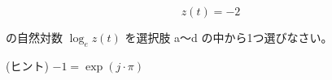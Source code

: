\[
z(t) = -2
\]

\bigskip
\noindent の自然対数 $\log_e z(t)$ を選択肢 a〜d の中から1つ選びなさい。 

\bigskip
\noindent (ヒント) $-1 = \exp(j \cdot \pi)$
